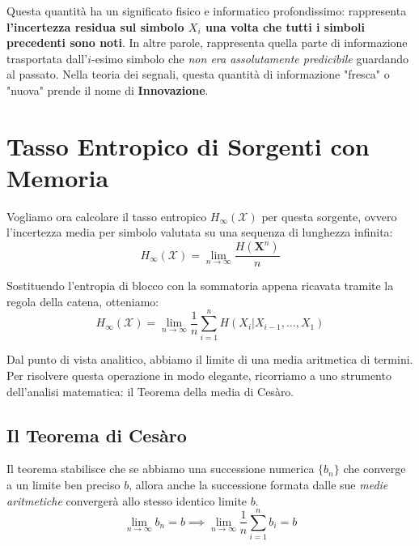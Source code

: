 Questa quantità ha un significato fisico e informatico profondissimo: rappresenta \textbf{l'incertezza residua sul simbolo $X_i$ una volta che tutti i simboli precedenti sono noti}. 
In altre parole, rappresenta quella parte di informazione trasportata dall'$i$-esimo simbolo che \textit{non era assolutamente predicibile} guardando al passato. Nella teoria dei segnali, questa quantità di informazione "fresca" o "nuova" prende il nome di \textbf{Innovazione}.

\section{Tasso Entropico di Sorgenti con Memoria}

Vogliamo ora calcolare il tasso entropico $H_\infty(\mathcal{X})$ per questa sorgente, ovvero l'incertezza media per simbolo valutata su una sequenza di lunghezza infinita:
\begin{equation}
    H_\infty(\mathcal{X}) = \lim_{n \to \infty} \frac{H(\mathbf{X}^n)}{n} 
\end{equation}

Sostituendo l'entropia di blocco con la sommatoria appena ricavata tramite la regola della catena, otteniamo:
\begin{equation}
\label{eq:rate_sum}
    H_\infty(\mathcal{X}) = \lim_{n \to \infty} \frac{1}{n} \sum_{i=1}^{n} H(X_i | X_{i-1}, \dots, X_1)
\end{equation}

Dal punto di vista analitico, abbiamo il limite di una media aritmetica di termini. Per risolvere questa operazione in modo elegante, ricorriamo a uno strumento dell'analisi matematica: il Teorema della media di Cesàro.

\subsection{Il Teorema di Cesàro}

Il teorema stabilisce che se abbiamo una successione numerica $\{b_n\}$ che converge a un limite ben preciso $b$, allora anche la successione formata dalle sue \textit{medie aritmetiche} convergerà allo stesso identico limite $b$.
\begin{equation*}
    \lim_{n \to \infty} b_n = b \implies \lim_{n \to \infty} \frac{1}{n} \sum_{i=1}^{n} b_i = b
\end{equation*}

